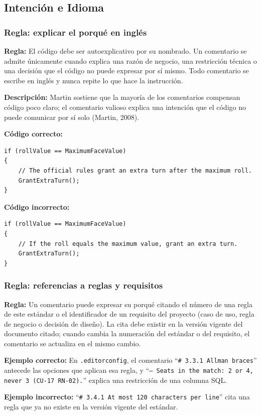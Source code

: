 \subsection{Intención e Idioma}

\subsubsection{Regla: explicar el porqué en inglés}

\textbf{Regla:} El código debe ser autoexplicativo por su nombrado. Un comentario se admite únicamente cuando explica una razón de negocio, una restricción técnica o una decisión que el código no puede expresar por sí mismo. Todo comentario se escribe en inglés y nunca repite lo que hace la instrucción.

\textbf{Descripción:} Martin sostiene que la mayoría de los comentarios compensan código poco claro; el comentario valioso explica una intención que el código no puede comunicar por sí solo (Martin, 2008).

\textbf{Código correcto:}
\begin{lstlisting}[style=csharpstyle]
if (rollValue == MaximumFaceValue)
{
    // The official rules grant an extra turn after the maximum roll.
    GrantExtraTurn();
}
\end{lstlisting}

\textbf{Código incorrecto:}
\begin{lstlisting}[style=csharpstyle]
if (rollValue == MaximumFaceValue)
{
    // If the roll equals the maximum value, grant an extra turn.
    GrantExtraTurn();
}
\end{lstlisting}

\subsubsection{Regla: referencias a reglas y requisitos}

\textbf{Regla:} Un comentario puede expresar su porqué citando el número de una regla de este estándar o el identificador de un requisito del proyecto (caso de uso, regla de negocio o decisión de diseño). La cita debe existir en la versión vigente del documento citado; cuando cambia la numeración del estándar o del requisito, el comentario se actualiza en el mismo cambio.

\textbf{Ejemplo correcto:} En \texttt{.editorconfig}, el comentario ``\texttt{\# 3.3.1 Allman braces}'' antecede las opciones que aplican esa regla, y ``\texttt{-- Seats in the match: 2 or 4, never 3 (CU-17 RN-02).}'' explica una restricción de una columna SQL.

\textbf{Ejemplo incorrecto:} ``\texttt{\# 3.4.1 At most 120 characters per line}'' cita una regla que ya no existe en la versión vigente del estándar.
